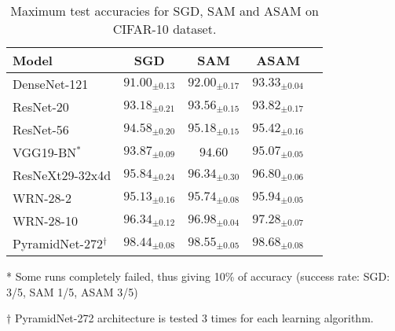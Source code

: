 \documentclass{article}
\newcommand{\mf}[1]{\mathbf{#1}}
\begin{document}
\begin{table}[t]
\ificml
\else
    \centering
\fi
\begin{threeparttable}
\caption{Maximum test accuracies for SGD, SAM and ASAM on CIFAR-10 dataset. \label{table1}}
\begin{center}
\begin{small}
\begin{tabular}{lcccr}
\toprule
Model & SGD & SAM & ASAM \\
\midrule
DenseNet-121 & $91.00_{\pm 0.13}$ & $92.00_{\pm 0.17}$ & $\mf{93.33}_{\pm 0.04}$ \\
ResNet-20 & $93.18_{\pm 0.21}$ & $93.56_{\pm 0.15}$ & $\mf{93.82}_{\pm 0.17}$ \\
ResNet-56 & $94.58_{\pm 0.20}$ & $95.18_{\pm 0.15}$ & $\mf{95.42}_{\pm 0.16}$ \\
VGG19-BN$^*$ & $93.87_{\pm 0.09}$ & $94.60$ & $\mf{95.07}_{\pm 0.05}$ \\
{\fontsize{8}{9.6}\selectfont ResNeXt29-32x4d} & $95.84_{\pm 0.24}$ & $96.34_{\pm 0.30}$ & $\mf{96.80}_{\pm 0.06}$ \\
WRN-28-2 & $95.13_{\pm 0.16}$ & $95.74_{\pm 0.08}$ & $\mf{95.94}_{\pm 0.05}$ \\
WRN-28-10 & $96.34_{\pm 0.12}$ & $96.98_{\pm 0.04}$ & $\mf{97.28}_{\pm 0.07}$ \\
\midrule
{\fontsize{8.5}{9.6}\selectfont PyramidNet-272}$^\dagger$ & $98.44_{\pm 0.08}$ & $98.55_{\pm 0.05}$ & $\mf{98.68}_{\pm 0.08}$ \\
\bottomrule
\end{tabular}
\begin{tablenotes}
\item[*] Some runs completely failed, thus giving 10\% of accuracy (success rate: SGD: 3/5, SAM 1/5, ASAM 3/5)
\item[$\dagger$] PyramidNet-272 architecture is tested 3 times for each learning algorithm.
\end{tablenotes}
\end{small}
\end{center}
\end{threeparttable}
\end{table}
\end{document}
